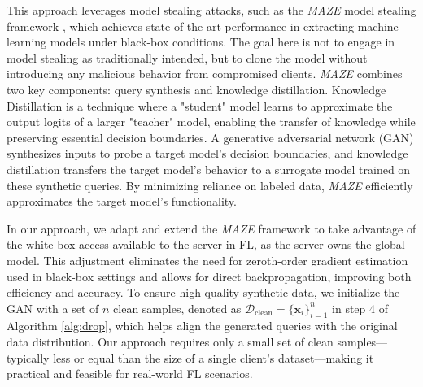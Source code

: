 
This approach leverages model stealing attacks, such as the \textit{MAZE} model stealing framework \citep{kariyappa2021maze}, which achieves state-of-the-art performance in extracting machine learning models under black-box conditions. The goal here is not to engage in model stealing as traditionally intended, but to clone the model without introducing any malicious behavior from compromised clients. \textit{MAZE} combines two key components: query synthesis and knowledge distillation. Knowledge Distillation \cite{hinton2015distillingknowledgeneuralnetwork} is a technique where a "student" model learns to approximate the output logits of a larger "teacher" model, enabling the transfer of knowledge while preserving essential decision boundaries. A generative adversarial network (GAN) \cite{radford2016unsupervisedrepresentationlearningdeep} synthesizes inputs to probe a target model's decision boundaries, and knowledge distillation transfers the target model's behavior to a surrogate model trained on these synthetic queries. By minimizing reliance on labeled data, \textit{MAZE} efficiently approximates the target model's functionality.

In our approach, we adapt and extend the \textit{MAZE} framework to take advantage of the white-box access available to the server in FL, as the server owns the global model. This adjustment eliminates the need for zeroth-order gradient estimation used in black-box settings and allows for direct backpropagation, improving both efficiency and accuracy. To ensure high-quality synthetic data, we initialize the GAN with a set of \( n \) clean samples, denoted as \( \mathcal{D}_\text{clean} = \{\mathbf{x}_i \}_{i=1}^n \) in step 4 of Algorithm \ref{alg:drop}, which helps align the generated queries with the original data distribution. Our approach requires only a small set of clean samples—typically less or equal than the size of a single client's dataset—making it practical and feasible for real-world FL scenarios.

